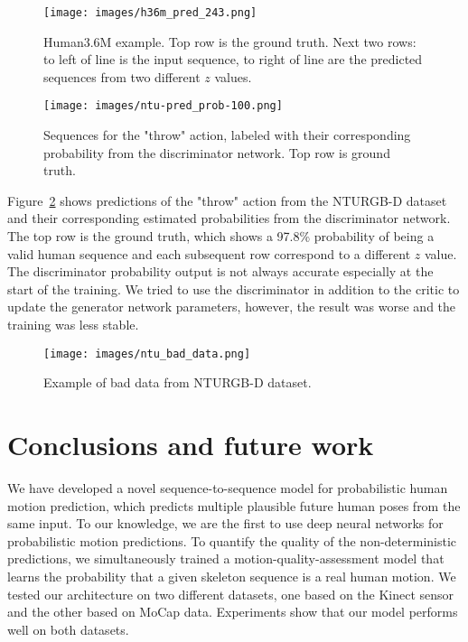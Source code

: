 \documentclass[10pt,twocolumn,letterpaper]{article}
\begin{document}
\begin{figure}[H]
\centering
\texttt{[image: images/h36m\_pred\_243.png]}
\caption{Human3.6M example. Top row is the ground truth. Next two rows: to left of line is the input sequence, to right of line are the predicted sequences from two different $z$ values.}
\label{figure:human36m}
\end{figure}

\begin{figure}[H]
\centering
\texttt{[image: images/ntu-pred\_prob-100.png]}
\caption{Sequences for the "throw" action, labeled with their corresponding probability from the discriminator network. Top row is ground truth.}
\label{figure:probability}
\end{figure}

Figure~\ref{figure:probability} shows predictions of the "throw" action from the NTURGB-D dataset and their corresponding estimated probabilities from the discriminator network. The top row is the ground truth, which shows a 97.8\% probability of being a valid human sequence and each subsequent row correspond to a different $z$ value. The discriminator probability output is not always accurate especially at the start of the training. We tried to use the discriminator in addition to the critic to update the generator network parameters, however, the result was worse and the training was less stable.

\begin{figure}[H]
\centering
\texttt{[image: images/ntu\_bad\_data.png]}
\caption{Example of bad data from NTURGB-D dataset.}
\label{figure:ntu-bad-data}
\end{figure}

\section{Conclusions and future work}

We have developed a novel sequence-to-sequence model for probabilistic human motion prediction, which predicts multiple plausible future human poses from the same input. To our knowledge, we are the first to use deep neural networks for probabilistic motion predictions. To quantify the quality of the non-deterministic predictions, we simultaneously trained a motion-quality-assessment model that learns the probability that a given skeleton sequence is a real human motion. We tested our architecture on two different datasets, one based on the Kinect sensor and the other based on MoCap data. Experiments show that our model performs well on both datasets.
\end{document}
